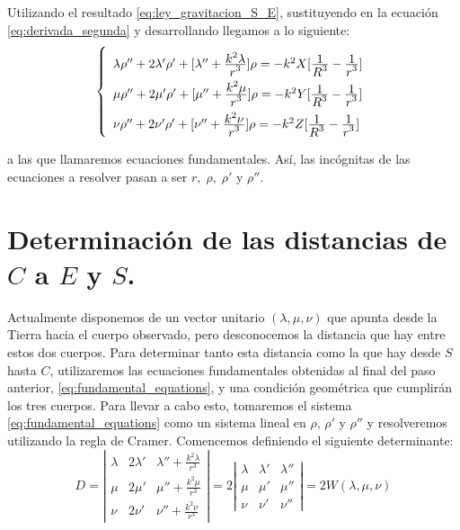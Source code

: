 \documentclass[11pt]{book}
\newcommand\ddfrac[2]{\frac{\displaystyle #1}{\displaystyle #2}}
\begin{document}
Utilizando el resultado \eqref{eq:ley_gravitacion_S_E}, sustituyendo en la ecuación \eqref{eq:derivada_segunda} y desarrollando llegamos a lo siguiente:
\begin{align}
\left\{
\def\arraystretch{2}
\begin{array}{l}
	\lambda\rho''+2\lambda'\rho'+[\lambda''+\ddfrac{k^2\lambda}{r^3}]\rho=-k^2X[\ddfrac{1}{R^3}-\ddfrac{1}{r^3}]\\
	\mu\rho''+2\mu'\rho'+[\mu''+\ddfrac{k^2\mu}{r^3}]\rho=-k^2Y[\ddfrac{1}{R^3}-\ddfrac{1}{r^3}]\\
	\nu\rho''+2\nu'\rho'+[\nu''+\ddfrac{k^2\nu}{r^3}]\rho=-k^2Z[\ddfrac{1}{R^3}-\ddfrac{1}{r^3}]
\end{array}
\right.
\label{eq:fundamental_equations}
\end{align}

\noindent a las que llamaremos ecuaciones fundamentales. Así, las incógnitas de las ecuaciones a resolver pasan a ser $r, \; \rho, \; \rho'$ y $\rho''$.\\



\section{Determinación de las distancias de $C$ a $E$ y $S$.}
\label{sec:distancias}
Actualmente disponemos de un vector unitario $(\lambda,\mu,\nu)$ que apunta desde la Tierra hacia el cuerpo observado, pero desconocemos la distancia que hay entre estos dos cuerpos. Para determinar tanto esta distancia como la que hay desde $S$ hasta $C$, utilizaremos las ecuaciones fundamentales obtenidas al final del paso anterior, \eqref{eq:fundamental_equations}, y una condición geométrica que cumplirán los tres cuerpos. Para llevar a cabo esto, tomaremos el sistema \eqref{eq:fundamental_equations} como un sistema lineal en $\rho$, $\rho'$ y $\rho''$ y resolveremos utilizando la regla de Cramer. Comencemos definiendo el siguiente determinante:
\[
D =
\left|
\begin{array}{ccc}
	\lambda & 2\lambda' & \lambda''+\frac{k^2\lambda}{r^3}\\
	\mu & 2\mu' & \mu''+\frac{k^2\mu}{r^3}\\
	\nu & 2\nu' & \nu''+\frac{k^2\nu}{r^3}
\end{array}
\right|
=
2
\left|
\begin{array}{ccc}
	\lambda & \lambda' & \lambda''\\
	\mu & \mu' & \mu''\\
	\nu & \nu' & \nu''
\end{array}
\right|
=2W(\lambda,\mu,\nu)
\]
\end{document}
